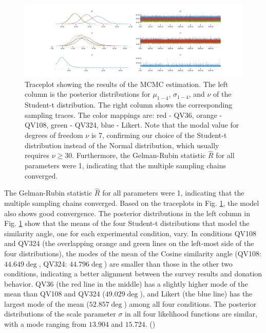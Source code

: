 \begin{figure}[htpb]
    \centering
    \includegraphics[trim= 2in 0in 2in 0in, clip, width=\textwidth, keepaspectratio=true]{content/image/StudentTIndep_VA_traceplot.pdf}
    \caption{
      Traceplot showing the results of the MCMC estimation. The left column is the posterior distributions for $\mu_{1-4}$, $\sigma_{1-4}$, and $\nu$ of the Student-t distribution. The right column shows the corresponding sampling traces. The color mappings are: red - QV36, orange - QV108, green - QV324, blue - Likert. Note that the modal value for degrees of freedom $\nu$ is 7, confirming our choice of the Student-t distribution instead of the Normal distribution, which usually requires $\nu \geq 30$. Furthermore, the Gelman-Rubin statistic $\hat{R}$ for all parameters were 1, indicating that the multiple sampling chains converged.
    }
    \label{fig:traceplot_exp1}
\end{figure}

The Gelman-Rubin statistic $\hat{R}$ for all parameters were 1, 
indicating that the multiple sampling chains converged.
Based on the traceplots in Fig. \ref{fig:traceplot_exp1}, 
the model also shows good convergence. 
The posterior distributions in the left column in Fig. \ref{fig:traceplot_exp1} show that the means of the four Student-t distributions that model the similarity angle, one for each experimental condition, vary. 
In conditions QV108 and QV324 (the overlapping orange and green lines on the left-most side of the four distributions),
the modes of the mean of the Cosine similarity angle 
(QV108: $44.649 \deg$, QV324: $44.796 \deg$) 
are smaller than those in the other two conditions, 
indicating a better alignment 
between the survey results and donation behavior. 
QV36 (the red line in the middle) has a slightly higher mode of the mean than QV108 and QV324 ($49.029 \deg$), and Likert (the blue line) has the largest mode of the mean ($52.857 \deg$) 
among all four conditions. 
The posterior distributions of the scale parameter $\sigma$
in all four likelihood functions are similar, 
with a mode ranging from $13.904$ and $15.724$. 
()


